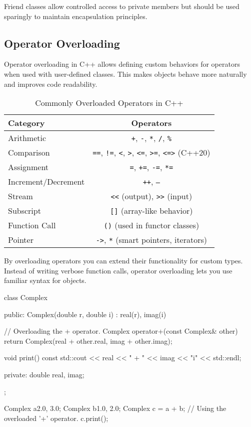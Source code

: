Friend classes allow controlled access to private members but should be used sparingly to maintain encapsulation principles.


\subsection{Operator Overloading}

Operator overloading in C++ allows defining custom behaviors for operators when used with user-defined classes. This makes objects behave more naturally and improves code readability.

\begin{table}[H]
    \centering
    \setlength{\tabcolsep}{20pt}
    \begin{tabulary}{\linewidth}{@{} L C @{}}
        \toprule
        \hfill \textbf{Category} \hfill & \textbf{Operators} \\
        \midrule
        Arithmetic & \texttt{+}, \texttt{-}, \texttt{*}, \texttt{/}, \texttt{\%} \\
        Comparison & \texttt{==}, \texttt{!=}, \texttt{<}, \texttt{>}, \texttt{<=}, \texttt{>=}, \texttt{<=>} (C++20) \\
        Assignment & \texttt{=}, \texttt{+=}, \texttt{-=}, \texttt{*=} \\
        Increment/Decrement & \texttt{++}, \texttt{--} \\
        Stream & \texttt{<<} (output), \texttt{>>} (input) \\
        Subscript & \texttt{[]} (array-like behavior) \\
        Function Call & \texttt{()} (used in functor classes) \\
        Pointer & \texttt{->}, \texttt{*} (smart pointers, iterators) \\
        \bottomrule
    \end{tabulary}
    \caption{Commonly Overloaded Operators in C++}
    \end{table}

\newpage

By overloading operators you can extend their functionality for custom types. Instead of writing verbose function calls, operator overloading lets you use familiar syntax for objects.

\begin{exampleblock}
\begin{codeblock}[language=C++, numbers=none]
class Complex {
public:
    Complex(double r, double i) : real(r), imag(i) {}

    // Overloading the + operator.
    Complex operator+(const Complex& other) {
        return Complex(real + other.real, imag + other.imag);
    }

    void print() const {
        std::cout << real << " + " << imag << "i" << std::endl;
    }

private:
    double real, imag;
};

Complex a{2.0, 3.0};
Complex b{1.0, 2.0};
Complex c = a + b; // Using the overloaded '+' operator.
c.print();
\end{codeblock}
\end{exampleblock}

